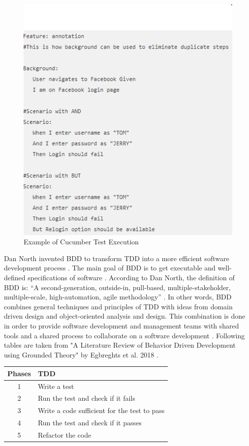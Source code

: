 \documentclass[conference, onecolumn, a4, 12pt]{IEEEtran}
\begin{document}
\begin{figure}
	\includegraphics[width=\linewidth]{cucumber_figure.png}
	\caption{Example of Cucumber Test Execution}
	\label{fig1}
\end{figure}

Dan North invented BDD to transform TDD into a more efficient software development process \cite{d2}. The main goal of BDD is to get executable and well-defined specifications of software \cite{d2}. According to Dan North, the definition of BDD
is: “A second-generation, outside-in, pull-based, multiple-stakeholder, multiple-scale, high-automation, agile methodology” \cite{d3}. In other words, BDD combines general
techniques and principles of TDD with ideas from domain driven design and object-oriented analysis and design. This combination is done in order to provide software development and management teams with shared tools and a shared process to collaborate on a software development \cite{d1}. Following tables are taken from "A Literature Review of Behavior Driven Development using Grounded Theory" by Egbreghts et al. 2018 \cite{d1}.\newline

\begin{tabular}{|c|p{6cm}|}
	\hline 
	Phases & TDD \\ 
	\hline 
	1 & Write a test \\ 
	\hline 
	2 & Run the test and check
	if it fails \\ 
	\hline 
	3 & Write a code sufficient
	for the test to pass \\ 
	\hline 
	4 & Run the test and check
	if it passes \\ 
	\hline 
	5 & Refactor the code \\ 
	\hline 
\end{tabular} 
\end{document}
